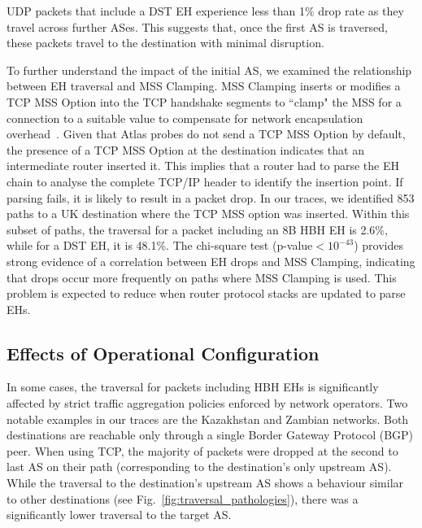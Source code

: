 \documentclass[conference]{IEEEtran}
\begin{document}
UDP packets that include a DST EH experience less than 1\% drop rate as they travel across further ASes.  This
suggests that, once the first AS is traversed, these packets travel to the destination with minimal disruption.



To further understand the impact of the initial AS, we examined the
relationship between EH traversal and MSS Clamping.
MSS Clamping inserts or modifies a TCP MSS Option into the TCP handshake segments
to ``clamp" the MSS for a connection to a suitable value to compensate for
network encapsulation overhead~\cite{custura-mtu}.  
Given that Atlas probes do not send a TCP MSS Option by default, the
presence of a TCP MSS Option at the destination indicates that an intermediate
router inserted it. This implies that a router had to parse the EH chain to analyse
the complete TCP/IP header to identify the insertion point. If parsing
fails, it is likely to result in a packet drop.
In our traces, we identified 853 paths to a UK destination where the TCP
MSS option was inserted. Within
this subset of paths, the traversal for a packet including an 8B HBH EH is 2.6\%, while for a DST EH, it is 48.1\%. The chi-square test (p-value$<10^{-43}$) provides
strong evidence of a correlation between EH drops and MSS Clamping, indicating
that drops occur more frequently on paths where MSS Clamping is used. This problem is expected to reduce when router protocol stacks are updated to parse EHs. 

\subsection{Effects of Operational Configuration}
    \label{subsec: pathologies}

In some cases, the traversal for packets including HBH EHs is significantly
affected by strict traffic aggregation policies enforced by network operators.
Two notable examples in our traces are the Kazakhstan and Zambian networks.
Both destinations are reachable only through a single Border Gateway Protocol (BGP) peer. When using TCP, the majority of packets were dropped at the
second to last AS on their path (corresponding to the destination's only upstream AS).
While the traversal to the destination's upstream AS shows a behaviour
similar to other destinations (see Fig.~\ref{fig:traversal_pathologies}),
there was a significantly lower traversal to the target AS.
\end{document}
